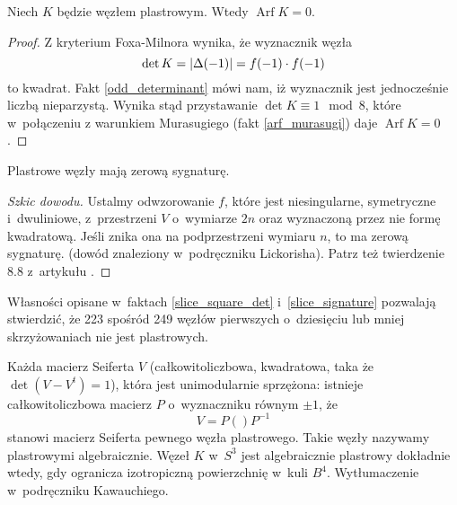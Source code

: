 
\begin{proposition}
    Niech $K$ będzie węzłem plastrowym.
    Wtedy $\operatorname{Arf} K = 0$.
\end{proposition}

\begin{proof}
    Z kryterium Foxa-Milnora wynika, że wyznacznik węzła
    \begin{equation}
        \det K = |\Delta(-1)| = f(-1)\cdot f(-1)
    \end{equation}
    to kwadrat.
    Fakt \ref{odd_determinant} mówi nam, iż wyznacznik jest jednocześnie liczbą nieparzystą.
    Wynika stąd przystawanie $\det K \equiv 1 \mod 8$, które w~połączeniu z warunkiem Murasugiego (fakt \ref{arf_murasugi}) daje $\operatorname{Arf} K = 0$.
\end{proof}

\begin{proposition} \label{slice_signature}
    Plastrowe węzły mają zerową sygnaturę.
\end{proposition}

\begin{proof}[Szkic dowodu]
    Ustalmy odwzorowanie $f$, które jest niesingularne, symetryczne i~dwuliniowe, z~przestrzeni $V$ o~wymiarze $2n$ oraz wyznaczoną przez nie formę kwadratową.
    Jeśli znika ona na podprzestrzeni wymiaru $n$, to ma zerową sygnaturę.
    (dowód znaleziony w~podręczniku Lickorisha).
    Patrz też twierdzenie 8.8 z~artykułu \cite{murasugi65}.
\end{proof}

Własności opisane w~faktach \ref{slice_square_det} i~\ref{slice_signature} pozwalają stwierdzić, że 223 spośród 249 węzłów pierwszych o~dziesięciu lub mniej skrzyżowaniach nie jest plastrowych.

Każda macierz Seiferta $V$ (całkowitoliczbowa, kwadratowa, taka że $\det (V - V^t) = 1$), która jest unimodularnie sprzężona: istnieje całkowitoliczbowa macierz $P$ o~wyznaczniku równym $\pm 1$, że
\[
    V = P () P^{-1}
\]
stanowi macierz Seiferta pewnego węzła plastrowego.
Takie węzły nazywamy plastrowymi algebraicznie.
Węzeł $K$ w~$S^3$ jest algebraicznie plastrowy dokładnie wtedy, gdy ogranicza izotropiczną powierzchnię w~kuli $B^4$.
Wytłumaczenie w~podręczniku Kawauchiego.

